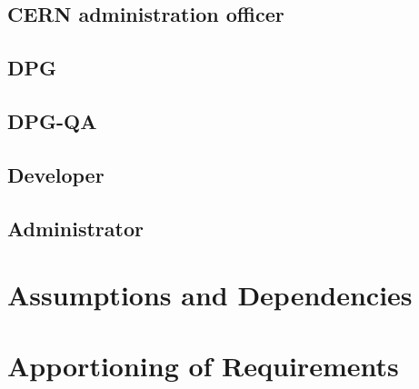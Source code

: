 \subsection{CERN administration officer}

\subsection{DPG}

\subsection{DPG-QA}

\subsection{Developer}

\subsection{Administrator}



\section{Assumptions and Dependencies}
\section{Apportioning of Requirements}
